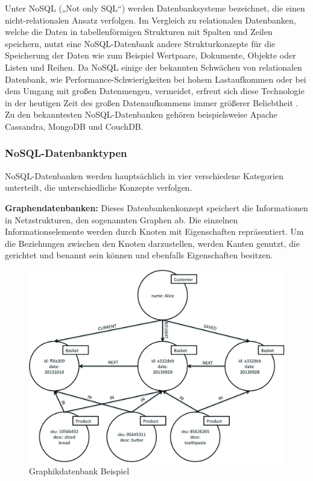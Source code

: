 Unter NoSQL („Not only SQL“) werden Datenbanksysteme bezeichnet, die einen nicht-relationalen Ansatz verfolgen. Im Vergleich zu relationalen Datenbanken, welche die Daten in tabellenförmigen Strukturen mit Spalten und Zeilen speichern, nutzt eine NoSQL-Datenbank andere Strukturkonzepte für die Speicherung der Daten wie zum Beispiel Wertpaare, Dokumente, Objekte oder Listen und Reihen. Da NoSQL einige der bekannten Schwächen von relationalen Datenbank, wie Performance-Schwierigkeiten bei hohem Lastaufkommen oder bei dem Umgang mit großen Datenmengen, vermeidet, erfreut sich diese Technologie in der heutigen Zeit des großen Datenaufkommens immer größerer Beliebtheit \cite{DB1}.
Zu den bekanntesten NoSQL-Datenbanken gehören beispielsweise Apache Cassandra, MongoDB und CouchDB.
\newline

\subsubsection{NoSQL-Datenbanktypen}
NoSQL-Datenbanken werden hauptsächlich in vier verschiedene Kategorien unterteilt, die unterschiedliche Konzepte verfolgen.
\newline

\noindent
{}
\textbf{Graphendatenbanken:}
Dieses Datenbankenkonzept speichert die Informationen in Netzstrukturen, den sogenannten Graphen ab. Die einzelnen Informationselemente werden durch Knoten mit Eigenschaften repräsentiert. Um die Beziehungen zwischen den Knoten darzustellen, werden Kanten genutzt, die gerichtet und benannt sein können und ebenfalls Eigenschaften besitzen.

\begin{figure}[tbt]
\centering
\includegraphics[]{images/graphikdatabase.jpg}
\caption[Graphikdatenbank Beispiel]{Graphikdatenbank Beispiel \protect \footnotemark}
\end{figure}

